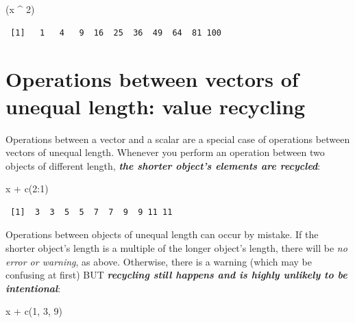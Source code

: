 \documentclass[
]{book}
\makeatletter
\newenvironment{Shaded}{\begin{snugshade}}{\end{snugshade}}
\newcommand{\DecValTok}[1]{\textcolor[rgb]{0.00,0.00,0.81}{#1}}
\newcommand{\FunctionTok}[1]{\textcolor[rgb]{0.00,0.00,0.00}{#1}}
\newcommand{\NormalTok}[1]{#1}
\newcommand{\SpecialCharTok}[1]{\textcolor[rgb]{0.00,0.00,0.00}{#1}}
\newenvironment{kframe}{%
\medskip{}
\setlength{\fboxsep}{.8em}
 \def\at@end@of@kframe{}%
 \ifinner\ifhmode%
  \def\at@end@of@kframe{\end{minipage}}%
  \begin{minipage}{\columnwidth}%
 \fi\fi%
 \def\FrameCommand##1{\hskip\@totalleftmargin \hskip-\fboxsep
 \colorbox{shadecolor}{##1}\hskip-\fboxsep
     \hskip-\linewidth \hskip-\@totalleftmargin \hskip\columnwidth}%
 \MakeFramed {\advance\hsize-\width
   \@totalleftmargin\z@ \linewidth\hsize
   \@setminipage}}%
 {\par\unskip\endMakeFramed%
 \at@end@of@kframe}
\newenvironment{rmdblock}[1]
  {
  \begin{itemize}
  \renewcommand{\labelitemi}{
    \raisebox{-.7\height}[0pt][0pt]{
      {\setkeys{Gin}{width=3em,keepaspectratio}\texttt{[image: images/\#1]}}
    }
  }
  \setlength{\fboxsep}{1em}
  \begin{kframe}
  \item
  }
  {
  \end{kframe}
  \end{itemize}
  }
\newenvironment{warning}
  {\begin{rmdblock}{warning}}
  {\end{rmdblock}}
\makeatother
\begin{document}
\begin{Shaded}
\begin{Highlighting}[]
\NormalTok{(x }\SpecialCharTok{\^{}} \DecValTok{2}\NormalTok{)}
\end{Highlighting}
\end{Shaded}

\begin{verbatim}
 [1]   1   4   9  16  25  36  49  64  81 100
\end{verbatim}

\hypertarget{operations-between-vectors-of-unequal-length-value-recycling}{%
\section{\texorpdfstring{Operations between vectors of unequal length: \textbf{value recycling}}{Operations between vectors of unequal length: value recycling}}\label{operations-between-vectors-of-unequal-length-value-recycling}}

Operations between a vector and a scalar are a special case of operations between vectors of unequal length. Whenever you perform an operation between two objects of different length, \textbf{\emph{the shorter object's elements are recycled}}:

\begin{Shaded}
\begin{Highlighting}[]
\NormalTok{x }\SpecialCharTok{+} \FunctionTok{c}\NormalTok{(}\DecValTok{2}\SpecialCharTok{:}\DecValTok{1}\NormalTok{)}
\end{Highlighting}
\end{Shaded}

\begin{verbatim}
 [1]  3  3  5  5  7  7  9  9 11 11
\end{verbatim}

\begin{warning}
Operations between objects of unequal length can occur by mistake. If
the shorter object's length is a multiple of the longer object's length,
there will be \emph{no error or warning}, as above. Otherwise, there is
a warning (which may be confusing at first) BUT \textbf{\emph{recycling
still happens and is highly unlikely to be intentional}}:
\end{warning}

\begin{Shaded}
\begin{Highlighting}[]
\NormalTok{x }\SpecialCharTok{+} \FunctionTok{c}\NormalTok{(}\DecValTok{1}\NormalTok{, }\DecValTok{3}\NormalTok{, }\DecValTok{9}\NormalTok{)}
\end{Highlighting}
\end{Shaded}
\end{document}
